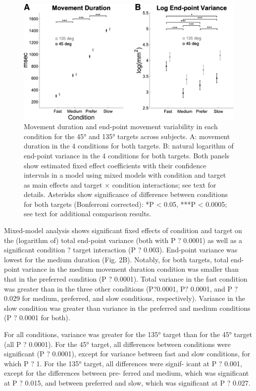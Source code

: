 \begin{figure}
	\centering
	\includegraphics[width=0.8\linewidth]{figures/MT-data}
	\caption[Movement duration and end-point movement variability]{Movement duration and end-point movement variability in each condition for the 45° and 135° targets across subjects. A: movement duration in the 4 conditions for both targets. B: natural logarithm of end-point variance in the 4 conditions for both targets. Both panels show estimated fixed effect coefficients with their confidence intervals in a model using mixed models with condition and target as main effects and target × condition interactions; see text for details. Asterisks show significance of difference between conditions for both targets (Bonferroni corrected): *P < 0.05, ***P < 0.0005; see text for additional comparison results.}
	\label{fig:mt-data}
\end{figure}


Mixed-model analysis shows significant fixed effects of condition and target on the (logarithm of) total end-point variance (both with P ? 0.0001) as well as a significant condition ? target interaction (P ? 0.003). End-point variance was lowest for the medium duration (Fig. 2B). Notably, for both targets, total end-point variance in the medium movement duration condition was smaller than that in the preferred condition (P ? 0.0001). Total variance in the fast condition was greater than in the three other conditions (P?0.0001, P? 0.0001, and P ? 0.029 for medium, preferred, and slow conditions, respectively). Variance in the slow condition was greater than variance in the preferred and medium conditions (P ? 0.0001 for both).

For all conditions, variance was greater for the 135° target
than for the 45° target (all P ? 0.0001). For the 45° target, all differences between conditions were significant (P ? 0.0001), except for variance between fast and slow conditions, for which P ? 1. For the 135° target, all differences were signif- icant at P ? 0.001, except for the differences between pre- ferred and medium, which was significant at P ? 0.015, and between preferred and slow, which was significant at P ? 0.027.

